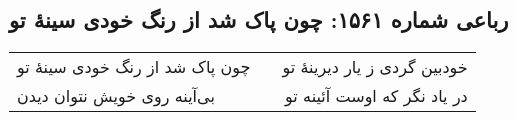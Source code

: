 \begin{center}
\section*{رباعی شماره ۱۵۶۱: چون پاک شد از رنگ خودی سینهٔ تو}
\label{sec:1561}
\begin{longtable}{l p{0.5cm} r}
چون پاک شد از رنگ خودی سینهٔ تو
&&
خودبین گردی ز یار دیرینهٔ تو
\\
بی‌آینه روی خویش نتوان دیدن
&&
در یاد نگر که اوست آئینه تو
\\
\end{longtable}
\end{center}
